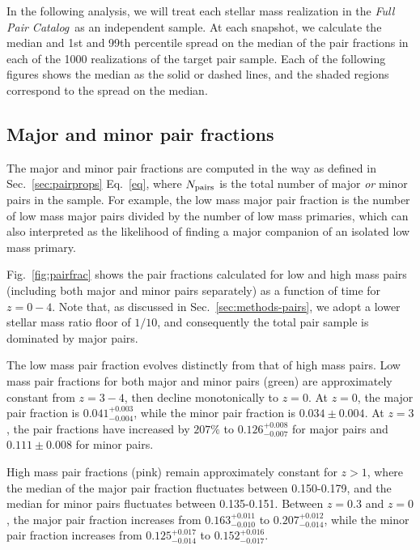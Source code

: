 \documentclass[linenumbers,twocolumn]{aastex631}
\newcommand{\paircat}{\textit{Full Pair Catalog}}
\begin{document}
In the following analysis, we will treat each stellar mass realization in the \paircat\ as an independent sample. 
At each snapshot, we calculate the median and 1st and 99th percentile spread on the median of the pair fractions in each of the 1000 realizations of the target pair sample.
Each of the following figures shows the median as the solid or dashed lines, and the shaded regions correspond to the spread on the median. 

    \subsection{Major and minor pair fractions}\label{sec:results-frac}
    The major and minor pair fractions are computed in the way as defined in Sec.~\ref{sec:pairprops} Eq.~\ref{eq}, where $N_{\rm pairs}$ is the total number of major \textit{or} minor pairs in the sample.
    For example, the low mass major pair fraction is the number of low mass major pairs divided by the number of low mass primaries, which can also interpreted as the likelihood of finding a major companion of an isolated low mass primary. 
    
    Fig.~\ref{fig:pairfrac} shows the pair fractions calculated for low and high mass pairs (including both major and minor pairs separately) as a function of time for $z=0-4$. 
    Note that, as discussed in Sec.~\ref{sec:methods-pairs}, we adopt a lower stellar mass ratio floor of $1/10$, and consequently the total pair sample is dominated by major pairs. 
    
    The low mass pair fraction evolves distinctly from that of high mass pairs.
    Low mass pair fractions for both major and minor pairs (green) are approximately constant from $z=3-4$, then decline monotonically to $z=0$. At $z=0$, the major pair fraction is $0.041^{+0.003}_{-0.004}$, while the minor pair fraction is $0.034\pm0.004$.
    At $z=3$, the pair fractions have increased by $207\%$ to $0.126^{+0.008}_{-0.007}$ for major pairs and $0.111\pm0.008$ for minor pairs. 

    High mass pair fractions (pink) remain approximately constant for $z>1$, where the median of the major pair fraction fluctuates between 0.150-0.179, and the median for minor pairs fluctuates between 0.135-0.151.
    Between $z=0.3$ and $z=0$, the major pair fraction increases from $0.163^{+0.011}_{-0.010}$ to $0.207^{+0.012}_{-0.014}$, while the minor pair fraction increases from $0.125^{+0.017}_{-0.014}$ to $0.152^{+0.016}_{-0.017}$.
    
\end{document}
